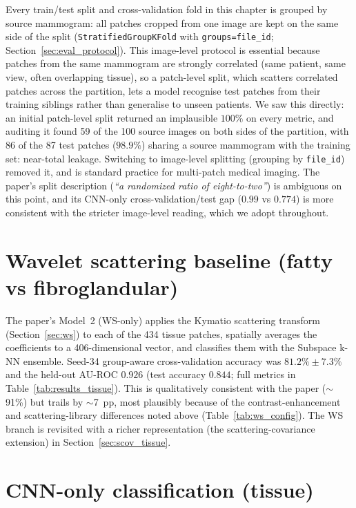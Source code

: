 Every train/test split and cross-validation fold in this chapter is grouped by source mammogram: all patches cropped from one image are kept on the same side of the split (\texttt{StratifiedGroupKFold} with \texttt{groups=file\_id}; Section~\ref{sec:eval_protocol}). This image-level protocol is essential because patches from the same mammogram are strongly correlated (same patient, same view, often overlapping tissue), so a patch-level split, which scatters correlated patches across the partition, lets a model recognise test patches from their training siblings rather than generalise to unseen patients. We saw this directly: an initial patch-level split returned an implausible $100\%$ on every metric, and auditing it found 59 of the 100 source images on both sides of the partition, with 86 of the 87 test patches ($98.9\%$) sharing a source mammogram with the training set: near-total leakage. Switching to image-level splitting (grouping by \texttt{file\_id}) removed it, and is standard practice for multi-patch medical imaging. The paper's split description (\emph{``a randomized ratio of eight-to-two''}) is ambiguous on this point, and its CNN-only cross-validation/test gap ($0.99$ vs $0.774$) is more consistent with the stricter image-level reading, which we adopt throughout.

\section{Wavelet scattering baseline (fatty vs fibroglandular)} \label{sec:stage1}

The paper's Model~2 (WS-only) applies the Kymatio scattering transform (Section~\ref{sec:ws}) to each of the 434 tissue patches, spatially averages the coefficients to a 406-dimensional vector, and classifies them with the Subspace k-NN ensemble. Seed-34 group-aware cross-validation accuracy was $81.2\% \pm 7.3\%$ and the held-out AU-ROC $0.926$ (test accuracy $0.844$; full metrics in Table~\ref{tab:results_tissue}). This is qualitatively consistent with the paper ($\sim$91\%) but trails by $\sim$7~pp, most plausibly because of the contrast-enhancement and scattering-library differences noted above (Table~\ref{tab:ws_config}). The WS branch is revisited with a richer representation (the scattering-covariance extension) in Section~\ref{sec:scov_tissue}.

\section{CNN-only classification (tissue)} \label{sec:stage4}

